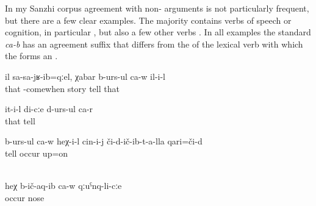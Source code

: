 In my Sanzhi corpus agreement with non- arguments is not particularly frequent, but there are a few clear examples. The majority contains verbs of speech or cognition, in particular   , but also a few other verbs . In all examples  the standard  \textit{ca-b} has an agreement suffix that differs from the  of the lexical verb with which the  forms an .
%
\begin{exe}
	\ex	\label{ex:when he came home, he was talking.}
	\gll	il	sa-sa-jʁ-ib=qːel, χabar	b-urs-ul	ca-w	il-i-l\\
		that	-comewhen	story	tell		that\\
	\glt	{}

	\ex	\label{ex:‎‎She is telling stories, she says to me}
	\gll	it-i-l	di-cːe	d-urs-ul	ca-r\\
		that		tell	\\
	\glt	{}

	\ex	\label{ex:‎‎He is telling about what he experienced}
	\gll	b-urs-ul	ca-w	heχ-i-l	cin-i-j	či-d-ič-ib-t-a-lla	qari=či-d\\
		tell				occur	up=on\\
	\glt	{}

	\\	\label{ex:She put it on HIS nose}
	\gll	heχ	b-ič-aq-ib	ca-w	qːuˁnq-li-cːe\\
			occur		nose\\
	\glt	{} 
\end{exe}

